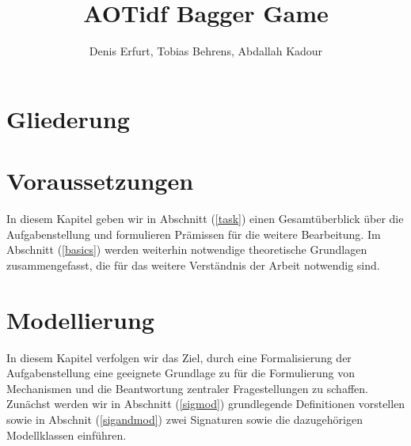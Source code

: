 \documentclass[sigconf]{acmart}
\theoremstyle{break}
\begin{document}
\title{AOTidf Bagger Game}
\author{Denis Erfurt, Tobias Behrens, Abdallah Kadour}

\begin{abstract}
  \noindent
\end{abstract}


\maketitle

\section{Gliederung}

\section{Voraussetzungen}
In diesem Kapitel geben wir in Abschnitt (\ref{task}) einen Gesamtüberblick über die Aufgabenstellung und formulieren Prämissen für die weitere Bearbeitung. Im Abschnitt (\ref{basics}) werden weiterhin notwendige theoretische Grundlagen zusammengefasst, die für das weitere Verständnis der Arbeit notwendig sind.



\section{Modellierung}
\label{mod}
In diesem Kapitel verfolgen wir das Ziel, durch eine Formalisierung der Aufgabenstellung eine geeignete Grundlage zu für die Formulierung von Mechanismen und die Beantwortung zentraler Fragestellungen zu schaffen. Zunächst werden wir in Abschnitt (\ref{sigmod}) grundlegende Definitionen vorstellen sowie in Abschnit (\ref{sigandmod}) zwei Signaturen sowie die dazugehörigen Modellklassen einführen.
\end{document}
